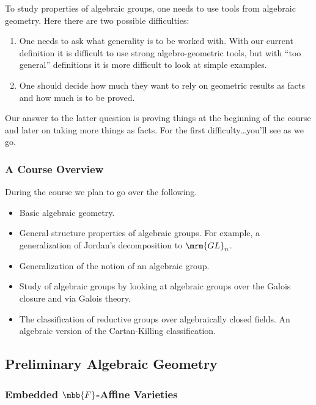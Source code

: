 \documentclass[10pt,a4paper,twoside,openany,hidelinks]{book}
\begin{document}
To study properties of algebraic groups, one needs to use tools from algebraic geometry. Here there are two possible difficulties:

\begin{enumerate}
\item One needs to ask what generality is to be worked with. With our current definition it is difficult to use strong algebro-geometric tools, but with ``too general'' definitions it is more difficult to look at simple examples.

\item One should decide how much they want to rely on geometric results as facts and how much is to be proved.
\end{enumerate}

Our answer to the latter question is proving things at the beginning of the course and later on taking more things as facts. For the first difficulty\ldots you'll see as we go.

\subsubsection{A Course Overview}

During the course we plan to go over the following.

\begin{itemize}
\item Basic algebraic geometry.

\item General structure properties of algebraic groups. For example, a generalization of Jordan's decomposition to $\mrm{GL}_n$.

\item Generalization of the notion of an algebraic group.

\item Study of algebraic groups by looking at algebraic groups over the Galois closure and via Galois theory.

\item The classification of reductive groups over algebraically closed fields. An algebraic version of the Cartan-Killing classification.
\end{itemize}

\subsection{Preliminary Algebraic Geometry}

\subsubsection{Embedded $\mbb{F}$-Affine Varieties}
\end{document}

